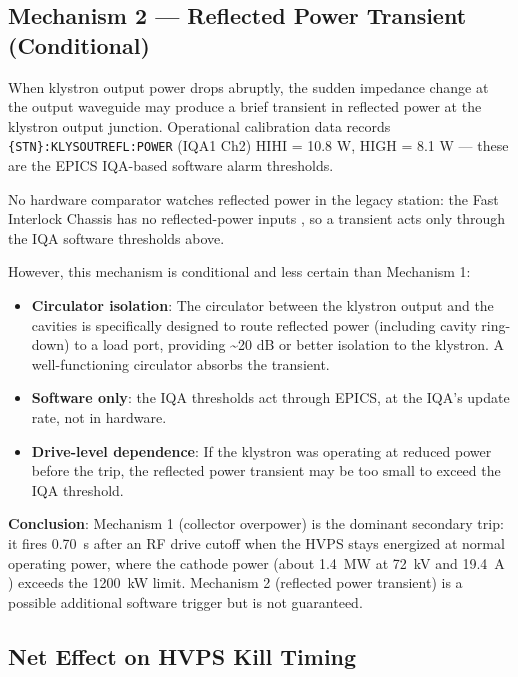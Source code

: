\subsection{Mechanism 2 --- Reflected Power Transient (Conditional)}\label{sec:cascade-reflected}


When klystron output power drops abruptly, the sudden impedance change at the output waveguide may produce a brief transient in reflected power at the klystron output junction. Operational calibration data records \texttt{\{STN\}:\allowbreak{}KLYSOUTREFL:\allowbreak{}POWER} (IQA1 Ch2) HIHI = 10.8 W, HIGH = 8.1 W --- these are the EPICS IQA-based software alarm thresholds.

No hardware comparator watches reflected power in the legacy station: the Fast Interlock Chassis has no reflected-power inputs , so a transient acts only through the IQA software thresholds above.

However, this mechanism is conditional and less certain than Mechanism 1:

\begin{itemize}
\tightlist
\item
  \textbf{Circulator isolation}: The circulator between the klystron output and the cavities is specifically designed to route reflected power (including cavity ring-down) to a load port, providing \textasciitilde20 dB or better isolation to the klystron. A well-functioning circulator absorbs the transient.
\item
  \textbf{Software only}: the IQA thresholds act through EPICS, at the IQA's update rate, not in hardware.
\item
  \textbf{Drive-level dependence}: If the klystron was operating at reduced power before the trip, the reflected power transient may be too small to exceed the IQA threshold.
\end{itemize}

\begin{keynote}
\textbf{Conclusion}: Mechanism 1 (collector overpower) is the dominant secondary trip: it fires \qty{0.70}{\second} after an RF drive cutoff when the HVPS stays energized at normal operating power, where the cathode power (about \qty{1.4}{\mega\watt} at \qty{72}{\kilo\volt} and \qty{19.4}{\ampere} ) exceeds the \qty{1200}{\kilo\watt} limit. Mechanism 2 (reflected power transient) is a possible additional software trigger but is not guaranteed.
\end{keynote}

\subsection{Net Effect on HVPS Kill Timing}\label{sec:cascade-net}


